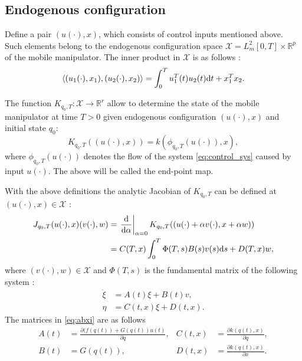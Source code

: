 \subsection{Endogenous configuration}
Define a pair $(u(\cdot), x)$, which consists of control inputs mentioned above.
Such elements belong to the endogenous configuration space
$\mathcal{X} = L_m^2[0, T] \times \mathbb{R}^p$ of the mobile manipulator.
The inner product in $\mathcal{X}$ is as follows \cite{ecs_ijc}:
\begin{equation}
\langle (u_1(\cdot), x_1), (u_2(\cdot), x_2) \rangle = \int_0^T u_1^T(t) u_2(t) \mathrm{d} t + x_1^T x_2.
\end{equation}

The function
$K_{q_0, T}: \mathcal{X} \rightarrow \mathbb{R}^r$
allow to determine the state of the mobile manipulator at time $T>0$ given
endogenous configuration $(u(\cdot), x)$ and initial state $q_0$:
\begin{equation}
K_{q_0, T}((u(\cdot), x)) = k(\phi_{q_0, T}(u(\cdot)), x),
\end{equation}
where $\phi_{q_0, T}(u(\cdot))$ denotes the flow of the system \eqref{eq:control_sys}
caused by input $u(\cdot)$. The above will be called the end-point map.

With the above definitions the analytic Jacobian of $K_{q_0, T}$ can be defined at $(u(\cdot), x) \in \mathcal{X}$ \cite{ratajczak2013multiple}:
\begin{align}
\label{eq:jacobian}
J_{q_0, T}(u(\cdot), x)(v(\cdot), w) &= \left.\frac{\mathrm{d}}{\mathrm{d} \alpha}\right|_{\alpha=0} K_{q_0, T}((u(\cdot)+\alpha v(\cdot), x+\alpha w))\\
 &= 
 C(T,x)\int_0^T \Phi(T,s)B(s)v(s)\mathrm{d} s + D(T,x)w,
\end{align}
where $(v(\cdot), w)\in \mathcal{X}$ and $\Phi(T,s)$ is the fundamental matrix of the following system \cite{tchon2004acceleration}:
\begin{equation}
\begin{aligned}
\label{eq:abxi}
\dot \xi &= A(t)\xi + B(t) v, \\
\eta &= C(t, x)\xi + D(t, x).
\end{aligned}
\end{equation}
The matrices in \eqref{eq:abxi} are as follows
\begin{equation}
\begin{aligned}
A(t) &= \frac{\partial (f(q(t))+G(q(t))u(t)}{\partial q}, & C(t, x) &= \frac{\partial k(q(t), x)}{\partial q},\\
B(t) &= G(q(t)), & D(t, x) &= \frac{\partial k(q(t), x)}{\partial x}.
\end{aligned}
\end{equation}

